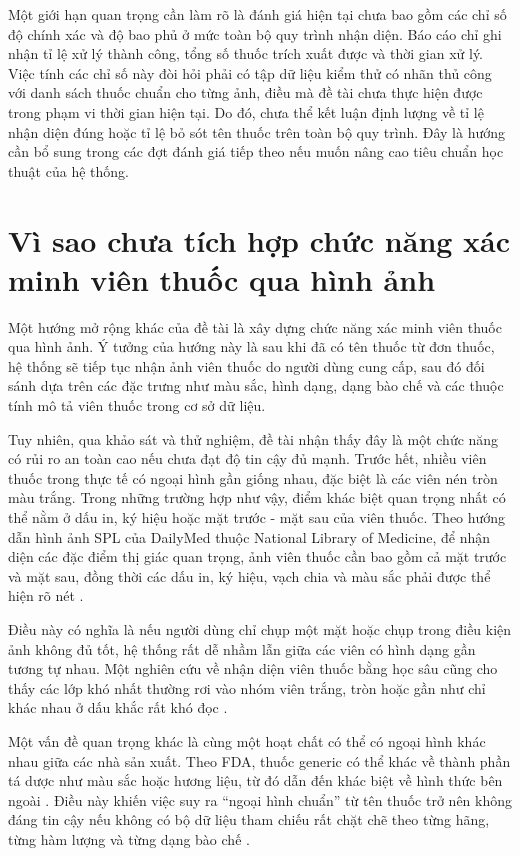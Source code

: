 \documentclass[12pt,a4paper]{report}
\begin{document}
Một giới hạn quan trọng cần làm rõ là đánh giá hiện tại chưa bao gồm các chỉ số độ chính xác và độ bao phủ ở mức toàn bộ quy trình nhận diện. Báo cáo chỉ ghi nhận tỉ lệ xử lý thành công, tổng số thuốc trích xuất được và thời gian xử lý. Việc tính các chỉ số này đòi hỏi phải có tập dữ liệu kiểm thử có nhãn thủ công với danh sách thuốc chuẩn cho từng ảnh, điều mà đề tài chưa thực hiện được trong phạm vi thời gian hiện tại. Do đó, chưa thể kết luận định lượng về tỉ lệ nhận diện đúng hoặc tỉ lệ bỏ sót tên thuốc trên toàn bộ quy trình. Đây là hướng cần bổ sung trong các đợt đánh giá tiếp theo nếu muốn nâng cao tiêu chuẩn học thuật của hệ thống.

\section{Vì sao chưa tích hợp chức năng xác minh viên thuốc qua hình ảnh}

Một hướng mở rộng khác của đề tài là xây dựng chức năng xác minh viên thuốc qua hình ảnh. Ý tưởng của hướng này là sau khi đã có tên thuốc từ đơn thuốc, hệ thống sẽ tiếp tục nhận ảnh viên thuốc do người dùng cung cấp, sau đó đối sánh dựa trên các đặc trưng như màu sắc, hình dạng, dạng bào chế và các thuộc tính mô tả viên thuốc trong cơ sở dữ liệu.

Tuy nhiên, qua khảo sát và thử nghiệm, đề tài nhận thấy đây là một chức năng có rủi ro an toàn cao nếu chưa đạt độ tin cậy đủ mạnh. Trước hết, nhiều viên thuốc trong thực tế có ngoại hình gần giống nhau, đặc biệt là các viên nén tròn màu trắng. Trong những trường hợp như vậy, điểm khác biệt quan trọng nhất có thể nằm ở dấu in, ký hiệu hoặc mặt trước - mặt sau của viên thuốc. Theo hướng dẫn hình ảnh SPL của DailyMed thuộc National Library of Medicine, để nhận diện các đặc điểm thị giác quan trọng, ảnh viên thuốc cần bao gồm cả mặt trước và mặt sau, đồng thời các dấu in, ký hiệu, vạch chia và màu sắc phải được thể hiện rõ nét \cite{dailymed-spl}.

Điều này có nghĩa là nếu người dùng chỉ chụp một mặt hoặc chụp trong điều kiện ảnh không đủ tốt, hệ thống rất dễ nhầm lẫn giữa các viên có hình dạng gần tương tự nhau. Một nghiên cứu về nhận diện viên thuốc bằng học sâu cũng cho thấy các lớp khó nhất thường rơi vào nhóm viên trắng, tròn hoặc gần như chỉ khác nhau ở dấu khắc rất khó đọc \cite{pill-ai}.

Một vấn đề quan trọng khác là cùng một hoạt chất có thể có ngoại hình khác nhau giữa các nhà sản xuất. Theo FDA, thuốc generic có thể khác về thành phần tá dược như màu sắc hoặc hương liệu, từ đó dẫn đến khác biệt về hình thức bên ngoài \cite{fda-generic}. Điều này khiến việc suy ra ``ngoại hình chuẩn'' từ tên thuốc trở nên không đáng tin cậy nếu không có bộ dữ liệu tham chiếu rất chặt chẽ theo từng hãng, từng hàm lượng và từng dạng bào chế \cite{generic-appearance}.
\end{document}
